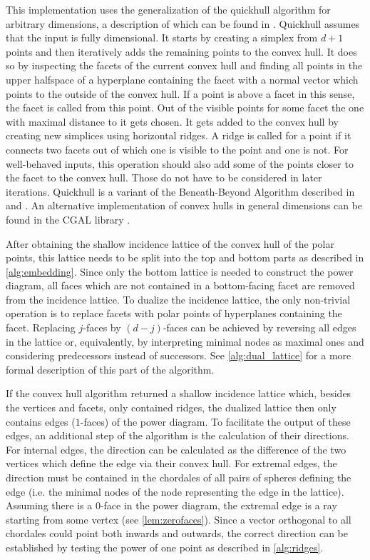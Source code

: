 This implementation uses the generalization of the quickhull algorithm for arbitrary dimensions, a description of which can be found in \cite{barber1996quickhull}.
Quickhull assumes that the input is fully dimensional.
It starts by creating a simplex from $d + 1$ points and then iteratively adds the remaining points to the convex hull.
It does so by inspecting the facets of the current convex hull and finding all points in the upper halfspace of a hyperplane containing the facet with a normal vector which points to the outside of the convex hull.
If a point is above a facet in this sense, the facet is called  from this point.
Out of the visible points for some facet the one with maximal distance to it gets chosen.
It gets added to the convex hull by creating new simplices using horizontal ridges.
A ridge is called  for a point if it connects two facets out of which one is visible to the point and one is not.
For well-behaved inputs, this operation should also add some of the points closer to the facet to the convex hull.
Those do not have to be considered in later iterations.
Quickhull is a variant of the Beneath-Beyond Algorithm described in \cite{grunbaum1963measures} and \cite{clarkson1989applications}.
An alternative implementation of convex hulls in general dimensions can be found in the CGAL library \cite{cgal:eb-15a}.

After obtaining the shallow incidence lattice of the convex hull of the polar points, this lattice needs to be split into the top and bottom parts as described in \cref{alg:embedding}.
Since only the bottom lattice is needed to construct the power diagram, all faces which are not contained in a bottom-facing facet are removed from the incidence lattice.
To dualize the incidence lattice, the only non-trivial operation is to replace facets with polar points of hyperplanes containing the facet.
Replacing $j$-faces by $(d-j)$-faces can be achieved by reversing all edges in the lattice or, equivalently, by interpreting minimal nodes as maximal ones and considering predecessors instead of successors.
See \cref{alg:dual_lattice} for a more formal description of this part of the algorithm.

If the convex hull algorithm returned a shallow incidence lattice which, besides the vertices and facets, only contained ridges, the dualized lattice then only contains edges ($1$-faces) of the power diagram.
To facilitate the output of these edges, an additional step of the algorithm is the calculation of their directions.
For internal edges, the direction can be calculated as the difference of the two vertices which define the edge via their convex hull.
For extremal edges, the direction must be contained in the chordales of all pairs of spheres defining the edge (i.e. the minimal nodes of the node representing the edge in the lattice).
Assuming there is a $0$-face in the power diagram, the extremal edge is a ray starting from some vertex (see \cref{lem:zerofaces}).
Since a vector orthogonal to all chordales could point both inwards and outwards, the correct direction can be established by testing the power of one point as described in \cref{alg:ridges}.

